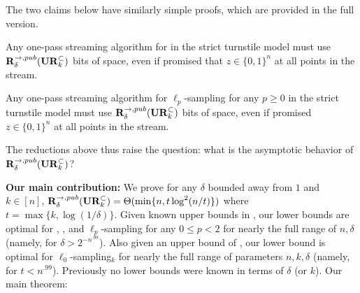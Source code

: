 The two claims below have similarly simple proofs, which are provided in the full version.

\begin{claim}
Any one-pass streaming algorithm for  in the strict turnstile model must use $\mathbf{R}^{\rightarrow,pub}_{\delta}(\mathbf{UR}_k^\subset)$ bits of space, even if promised that $z\in\{0,1\}^n$ at all points in the stream.
\end{claim}

\begin{claim}
Any one-pass streaming algorithm for $\ell_p$-sampling for any $p\ge 0$ in the strict turnstile model must use $\mathbf{R}^{\rightarrow,pub}_{\delta}(\mathbf{UR}_k^\subset)$ bits of space, even if promised $z\in\{0,1\}^n$ at all points in the stream.
\end{claim}

The reductions above thus raise the question: what is the asymptotic behavior of $\mathbf{R}^{\rightarrow,pub}_\delta(\mathbf{UR}_k^\subset)$?

\textbf{Our main contribution:} We prove for any $\delta$ bounded away from $1$ and $k\in[n]$, $\mathbf{R}^{\rightarrow,pub}_\delta(\mathbf{UR}_k^\subset) = \Theta(\min\{n, t\log^2(n/t)\})$ where $t = \max\{k,\log(1/\delta)\}$. Given known upper bounds in \cite{JowhariST11}, our lower bounds are optimal for , \suppfind{}, and $\ell_p$-sampling for any $0\le p<2$ for nearly the full range of $n, \delta$ (namely, for $\delta > 2^{-n^{.99}}$). Also given an upper bound of \cite{JowhariST11}, our lower bound is optimal for $\ell_0$-sampling$_k$ for nearly the full range of parameters $n, k, \delta$ (namely, for $t < n^{.99}$). Previously no lower bounds were known in terms of $\delta$ (or $k$). Our main theorem:

